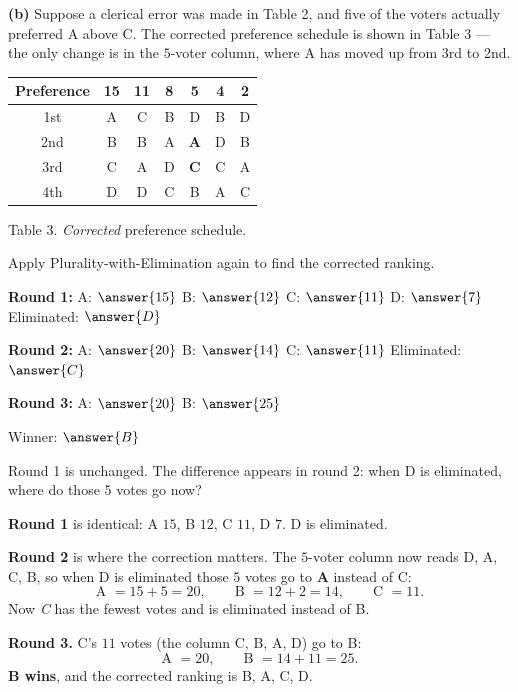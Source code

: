 \documentclass[12pt]{ximera}
\begin{document}
\begin{problem}
\begin{prompt}
\textbf{(b)} Suppose a clerical error was made in Table 2, and five of the voters
actually preferred A above C. The corrected preference schedule is shown in Table 3
--- the only change is in the $5$-voter column, where A has moved up from 3rd to 2nd.

\begin{center}
\begin{tabular}{c|cccccc}
Preference & 15 & 11 & 8 & \textbf{5} & 4 & 2 \\\hline
1st & A & C & B & D & B & D \\
2nd & B & B & A & \textbf{A} & D & B \\
3rd & C & A & D & \textbf{C} & C & A \\
4th & D & D & C & B & A & C
\end{tabular}

\smallskip
Table 3. \emph{Corrected} preference schedule.
\end{center}

Apply Plurality-with-Elimination again to find the corrected ranking.

\textbf{Round 1:} A: $\answer{15}$ \quad B: $\answer{12}$ \quad C: $\answer{11}$ \quad
D: $\answer{7}$ \qquad Eliminated: $\answer{D}$

\smallskip
\textbf{Round 2:} A: $\answer{20}$ \quad B: $\answer{14}$ \quad C: $\answer{11}$
\qquad Eliminated: $\answer{C}$

\smallskip
\textbf{Round 3:} A: $\answer{20}$ \quad B: $\answer{25}$

\smallskip
Winner: $\answer{B}$

\begin{hint}
Round 1 is unchanged. The difference appears in round 2: when D is eliminated, where
do those $5$ votes go now?
\end{hint}

\begin{feedback}
\textbf{Round 1} is identical: A $15$, B $12$, C $11$, D $7$. D is eliminated.

\textbf{Round 2} is where the correction matters. The $5$-voter column now reads
D, A, C, B, so when D is eliminated those $5$ votes go to \textbf{A} instead of C:
\[ \text{A } = 15+5 = 20, \qquad \text{B } = 12+2 = 14, \qquad \text{C } = 11. \]
Now \emph{C} has the fewest votes and is eliminated instead of B.

\textbf{Round 3.} C's $11$ votes (the column C, B, A, D) go to B:
\[ \text{A } = 20, \qquad \text{B } = 14+11 = 25. \]
\textbf{B wins}, and the corrected ranking is B, A, C, D.
\end{feedback}
\end{prompt}


\end{problem}
\end{document}
